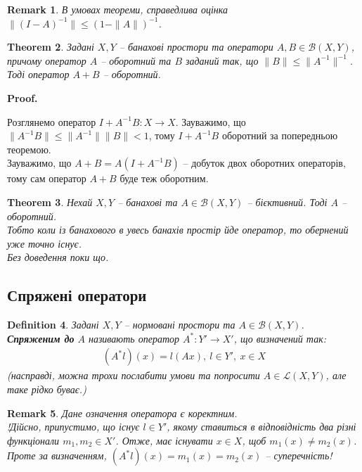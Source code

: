 \documentclass[a4paper, 10pt]{article}
\makeatletter
\theoremstyle{theoremdd}
\newtheorem{theorem}{Theorem}[subsection]
\theoremstyle{theoremdd}
\newtheorem{definition}[theorem]{Definition}
\theoremstyle{theoremdd}
\theoremstyle{theoremdd}
\theoremstyle{theoremdd}
\theoremstyle{theoremdd}
\newtheorem{remark}[theorem]{Remark}
\theoremstyle{theoremdd}
\theoremstyle{theoremdd}
\renewenvironment{proof}[1][Proof.\\]{\par
\pushQED{\hfill \qed}%
\normalfont \topsep6\p@\@plus6\p@\relax
\trivlist
\item\relax
{\bfseries
#1\@addpunct{.}}\hspace\labelsep\ignorespaces
}{%
\popQED\endtrivlist\@endpefalse
}
\makeatother
\begin{document}
\begin{remark}
В умовах теореми, справедлива оцінка $\|(I-A)^{-1}\| \leq (1 - \|A\|)^{-1}$.
\end{remark}

\begin{theorem}
\label{sum_of_operators_and_inverse}
Задані $X,Y$ -- банахові простори та оператори $A,B \in \mathcal{B}(X,Y)$, причому оператор $A$ -- оборотний та $B$ заданий так, що $\|B\| \leq \|A^{-1}\|^{-1}$. Тоді оператор $A+B$ -- оборотний.
\end{theorem}

\begin{proof}
Розглянемо оператор $I + A^{-1}B \colon X \to X$. Зауважимо, що $\|A^{-1}B\| \leq \|A^{-1}\| \|B\| < 1$, тому $I + A^{-1}B$ оборотний за попередньою теоремою.\\
Зауважимо, що $A+B = A (I + A^{-1}B)$ -- добуток двох оборотних операторів, тому сам оператор $A+B$ буде теж оборотним.
\end{proof}

\begin{theorem}
Нехай $X,Y$ -- банахові та $A \in \mathcal{B}(X,Y)$ -- бієктивний. Тоді $A$ -- оборотний.\\
\textit{Тобто коли із банахового в увесь банахів простір йде оператор, то обернений уже точно існує.}\\
\textit{Без доведення поки що.}
\end{theorem}

\subsection{Спряжені оператори}
\begin{definition}
Задані $X,Y$ -- нормовані простори та $A \in \mathcal{B}(X,Y)$.\\
\textbf{Спряженим до} $A$ називають оператор $A^* \colon Y' \to X'$, що визначений так:
\begin{align*}
(A^*l)(x) = l(Ax),\ l \in Y',\ x \in X
\end{align*}
(насправді, можна трохи послабити умови та попросити $A \in \mathcal{L}(X,Y)$, але таке рідко буває.)
\end{definition}

\begin{remark}
Дане означення оператора є коректним.\\
!Дійсно, припустимо, що існує $l \in Y'$, якому ставиться в відповідність два різні функціонали $m_1,m_2 \in X'$. Отже, має існувати $x \in X$, щоб $m_1(x) \neq m_2(x)$. Проте за визначенням, $(A^*l)(x) = m_1(x) = m_2(x)$ -- суперечність!
\end{remark}
\end{document}
